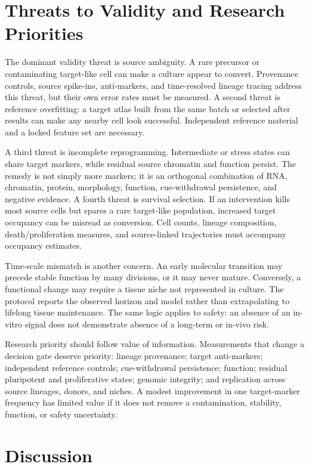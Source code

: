 \documentclass[10pt,conference]{IEEEtran}
\begin{document}
\section{Threats to Validity and Research Priorities}
\label{sec:validity}

The dominant validity threat is source ambiguity. A rare precursor or contaminating target-like cell can make a culture appear to convert. Provenance controls, source spike-ins, anti-markers, and time-resolved lineage tracing address this threat, but their own error rates must be measured. A second threat is reference overfitting: a target atlas built from the same batch or selected after results can make any nearby cell look successful. Independent reference material and a locked feature set are necessary.

A third threat is incomplete reprogramming. Intermediate or stress states can share target markers, while residual source chromatin and function persist. The remedy is not simply more markers; it is an orthogonal combination of RNA, chromatin, protein, morphology, function, cue-withdrawal persistence, and negative evidence. A fourth threat is survival selection. If an intervention kills most source cells but spares a rare target-like population, increased target occupancy can be misread as conversion. Cell counts, lineage composition, death/proliferation measures, and source-linked trajectories must accompany occupancy estimates.

Time-scale mismatch is another concern. An early molecular transition may precede stable function by many divisions, or it may never mature. Conversely, a functional change may require a tissue niche not represented in culture. The protocol reports the observed horizon and model rather than extrapolating to lifelong tissue maintenance. The same logic applies to safety: an absence of an in-vitro signal does not demonstrate absence of a long-term or in-vivo risk.

Research priority should follow value of information. Measurements that change a decision gate deserve priority: lineage provenance; target anti-markers; independent reference controls; cue-withdrawal persistence; function; residual pluripotent and proliferative states; genomic integrity; and replication across source lineages, donors, and niches. A modest improvement in one target-marker frequency has limited value if it does not remove a contamination, stability, function, or safety uncertainty.

\section{Discussion}
\label{sec:discussion}
\end{document}
